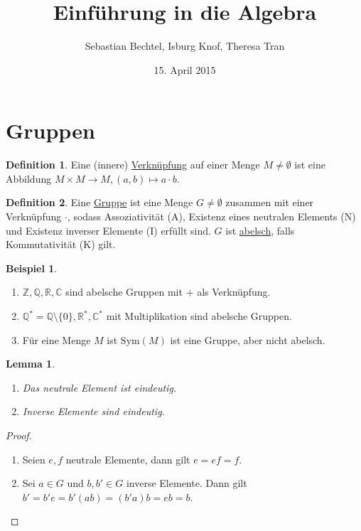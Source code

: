 \documentclass[12pt]{scrartcl}%
\newtheorem{lemma}{Lemma}
\theoremstyle{definition}
\newtheorem*{defn}{Definition}
\newtheorem{ex}{Beispiel}
\theoremstyle{remark}
\newcommand{\sym}{\text{Sym}}
\begin{document}
\author{Sebastian Bechtel, Isburg Knof, Theresa Tran}
\title{Einführung in die Algebra}
\date{15. April 2015}

\maketitle

\section{Gruppen}

\begin{defn}
    Eine (innere) \underline{Verknüpfung} auf einer Menge $M\neq \emptyset$ ist eine Abbildung $M\times M\to M, (a,b)\mapsto a\cdot b$.
\end{defn}

\begin{defn}
    Eine \underline{Gruppe} ist eine Menge $G\neq \emptyset$ zusammen mit einer Verknüpfung $\cdot$, sodass Assoziativität (A), Existenz eines neutralen Elements (N) und Existenz inverser Elemente (I) erfüllt sind. $G$ ist \underline{abelsch}, falls Kommutativität (K) gilt.
\end{defn}

\begin{ex}
    \begin{enumerate}
        \item $\mathbb{Z}, \mathbb{Q}, \mathbb{R}, \mathbb{C}$ sind abelsche Gruppen mit $+$ als Verknüpfung.
        \item $\mathbb{Q}^*=\mathbb{Q}\setminus \{0\}, \mathbb{R}^*, \mathbb{C}^*$ mit Multiplikation sind abelsche Gruppen.
        \item Für eine Menge $M$ ist $\sym(M)$ ist eine Gruppe, aber nicht abelsch.
    \end{enumerate}
\end{ex}

\begin{lemma}
    \begin{enumerate}[label=\alph*)]
        \item Das neutrale Element ist eindeutig.
        \item Inverse Elemente sind eindeutig.
    \end{enumerate}
\end{lemma}

\begin{proof}
    \begin{enumerate}[label=\alph*)]
        \item Seien $e,f$ neutrale Elemente, dann gilt $e=ef=f$.
        \item Sei $a\in G$ und $b,b'\in G$ inverse Elemente. Dann gilt $b'=b'e=b'(ab)=(b'a)b=eb=b$. 
    \end{enumerate}
\end{proof}
\end{document}
